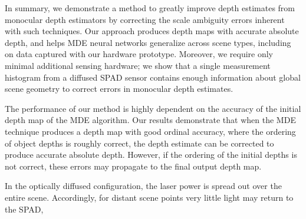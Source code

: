 In summary, we demonstrate a method to greatly improve depth estimates from
monocular depth estimators by correcting the scale ambiguity errors inherent
with such techniques. Our approach produces depth maps with accurate absolute
depth, and helps MDE neural networks generalize across scene
types, including on data captured with our hardware prototype.  Moreover, we
require only minimal additional sensing hardware; we show that a single
measurement histogram from a diffused SPAD sensor contains enough information
about global scene geometry to correct errors in monocular depth estimates.

The performance of our method is highly dependent on the accuracy of the initial
depth map of the MDE algorithm. Our results demonstrate that when the MDE
technique produces a depth map with good ordinal accuracy, where the ordering of
object depths is roughly correct, the depth estimate can be corrected to produce
accurate absolute depth. However, if the ordering of the initial depths is not
correct, these errors may propagate to the final output depth map.

In the optically diffused configuration, the laser
power is spread out over the entire scene. Accordingly, for distant scene points
very little light may return to the SPAD,  




